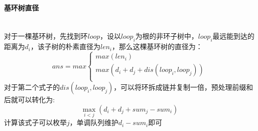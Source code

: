 \paragraph{基环树直径}~{}
\\
对于一棵基环树，先找到环$loop$，设以$loop_i$为根的非环子树中，$loop_i$最远能到达的距离为$d_i$，该子树的朴素直径为$len_i$，那么这棵基环树的直径为：\\
$$ans=max\begin{cases}
max(len_i)\\
max(d_i+d_j+dis(loop_i,loop_j))\\
\end{cases}$$
对于第二个式子的$dis(loop_i,loop_j)$，可以将环拆成链并复制一倍，预处理前缀和后就可以转化为:\\
$$\max_{i<j}(d_i+d_j+sum_j-sum_i)$$
计算该式子可以枚举$j$，单调队列维护$d_i-sum_i$即可\\